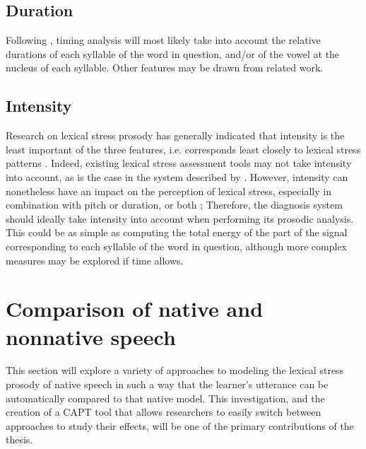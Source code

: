 		
	\subsection{Duration}
	\label{sec:prosody:duration}
	Following \textcite{Bonneau2011}, timing analysis will most likely take into account the relative durations of each syllable of the word in question, and/or of the vowel at the nucleus of each syllable. Other features may be drawn from related work.
	
	\subsection{Intensity}
	\label{sec:prosody:intensity}
		Research on lexical stress prosody has generally indicated that intensity is the least important of the three features, i.e. corresponds least closely to lexical stress patterns \citep{Cutler2005}. 
Indeed, existing lexical stress assessment tools may not take intensity into account, as is the case in the system described by \textcite{Bonneau2011}.  However, intensity can nonetheless have an impact on the perception of lexical stress, especially in combination with pitch or duration, or both \citep{Cutler2005}; %
Therefore, the diagnosis system should ideally take intensity into account when performing its prosodic analysis. This could be as simple as computing the total energy of the part of the signal corresponding to each syllable of the word in question, although more complex measures may be explored if time allows.
	
\section{Comparison of native and nonnative speech}
\label{sec:diag:compare}

	This section will explore a variety of approaches to modeling the lexical stress prosody of native speech in such a way that the learner's utterance can be automatically compared to that native model. This investigation, and the creation of a CAPT tool that allows researchers to easily switch between approaches to study their effects, will be one of the primary contributions of the thesis.
		
